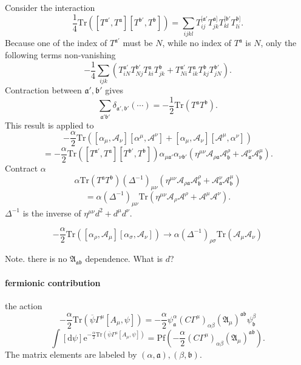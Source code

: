 Consider the interaction
\[
	\frac{1}{4}\mathrm{Tr}([T^{\mathfrak{a}'},T^{\mathfrak{a}}]
	[T^{\mathfrak{b}'},T^{\mathfrak{b}}])
	= \sum_{ijkl} T^{[\mathfrak{a}'}_{ij} T^{\mathfrak{a}]}_{jk}
	T^{[\mathfrak{b}'}_{kl} T^{\mathfrak{b}]}_{li}
.\] 
Because one of the index of $T^{\mathfrak{a}'}$ must be $N$,
while no index of $T^{\mathfrak{a}}$ is $N$,
only the following terms non-vanishing
\[
	- \frac{1}{4}\sum_{ijk} \left(
	T^{\mathfrak{a}'}_{iN} T^{\mathfrak{b}'}_{Nj}
	T^{\mathfrak{a}}_{ki} T^{\mathfrak{b}}_{jk}
	+ T^{\mathfrak{a}'}_{Ni} T^{\mathfrak{a}}_{ik}
	T^{\mathfrak{b}}_{kj} T^{\mathfrak{b}'}_{jN}\right)
.\] 
Contraction between $\mathfrak{a}',\mathfrak{b}'$ gives
\[
	\sum_{\mathfrak{a}' \mathfrak{b}'} \delta_{\mathfrak{a}',\mathfrak{b}'}
	(\cdots)
	= - \frac{1}{2} \mathrm{Tr}(T^{\mathfrak{a}} T^{\mathfrak{b}})
.\] 
This result is applied to
\[
- \frac{\alpha}{2} \mathrm{Tr} \left( 
[\alpha_\mu,\mathcal{A}_\nu][\alpha^\mu,\mathcal{A}^\nu]
+ [\alpha_\mu,\mathcal{A}_\nu][\mathcal{A}^\mu,\alpha^\nu]\right) 
\] 
\[
	= - \frac{\alpha}{2}\mathrm{Tr}([T^{\mathfrak{a}'},T^{\mathfrak{a}}]
	[T^{\mathfrak{b}'},T^{\mathfrak{b}}]) 
	\alpha_{\mu \mathfrak{a}'} \alpha_{\nu \mathfrak{b}'}
	(\eta^{\mu\nu} \mathcal{A}_{\rho \mathfrak{a}} \mathcal{A}^\rho_{\mathfrak{b}}
	+ \mathcal{A}^\nu_{\mathfrak{a}} \mathcal{A}^\mu_{\mathfrak{b}})
.\] 
Contract $\alpha$
\[
	\alpha \mathrm{Tr}(T^{\mathfrak{a}} T^{\mathfrak{b}})
	(\Delta^{-1})_{\mu\nu}
	(\eta^{\mu\nu} \mathcal{A}_{\rho \mathfrak{a}} \mathcal{A}^\rho_{\mathfrak{b}}
	+ \mathcal{A}^\nu_{\mathfrak{a}} \mathcal{A}^\mu_{\mathfrak{b}})
\] 
\[
=\alpha 
	(\Delta^{-1})_{\mu\nu}
\mathrm{Tr} \left( 
\eta^{\mu\nu} \mathcal{A}_\rho \mathcal{A}^\rho
+ \mathcal{A}^\mu \mathcal{A}^\nu\right) 
.\] 
$\Delta^{-1}$ is the inverse of $\eta^{\mu\nu} d^2 + d^\mu d^\nu$.

\begin{correct}
	\begin{equation}
- \frac{\alpha}{2} \mathrm{Tr} \left( 
[\alpha_\rho,\mathcal{A}_\mu][\alpha_\sigma,\mathcal{A}_\nu]
\right) 
\to \alpha 
	(\Delta^{-1})_{\rho\sigma}
	\mathrm{Tr} \left( 
		\mathcal{A}_\mu \mathcal{A}_\nu
\right) 
\end{equation}
\end{correct}
Note. there is no $\mathfrak{A}_{\mathfrak{a}\mathfrak{b}}$ dependence.
What is $d$?

\paragraph{fermionic contribution}
the action
\begin{equation}
	- \frac{\alpha}{2} \mathrm{Tr}(\overline{\psi} \Gamma^\mu
	[A_\mu,\psi])
	= - \frac{\alpha}{2} \psi^\alpha_{\mathfrak{a}}
	(C\Gamma^\mu)_{\alpha\beta} (\mathfrak{A}_\mu)^{\mathfrak{a}\mathfrak{b}}
	\psi^\beta_{\mathfrak{b}}
\end{equation}
\[
	\int [\mathrm{d}\psi] \mathrm{e}^{
	- \frac{\alpha}{2} \mathrm{Tr}(\overline{\psi} \Gamma^\mu
	[A_\mu,\psi])}
	= \mathrm{Pf}\left( -\frac{\alpha}{2} 
	(C\Gamma^\mu)_{\alpha\beta}
	(\mathfrak{A}_\mu)^{\mathfrak{a}\mathfrak{b}}\right) 
.\] 
The matrix elements are labeled by $(\alpha,\mathfrak{a}),(\beta,\mathfrak{b})$.

